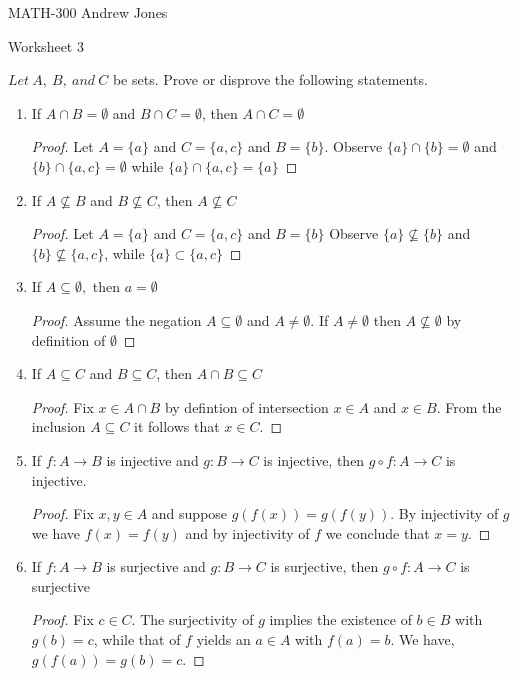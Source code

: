 \documentclass{article}
\begin{document}
  MATH-300 \hfill Andrew Jones
  \begin{center}
  {\huge Worksheet 3}
  \end{center}
  $Let\ A,\ B,\ and\ C$ be sets. Prove or disprove the following statements. \\
  \begin{enumerate}
  \item If $A\cap B = \emptyset$ and $B\cap C = \emptyset$, then $A\cap C = \emptyset$
    \begin{proof}
      Let $A = \{a\}$ and $C = \{a, c\}$ and $B = \{b\}$.
      Observe $\{a\}\cap \{b\} = \emptyset$ and $\{b\}\cap \{a, c\} = \emptyset$ while $\{a\}\cap \{a,c\} = \{a\}$
    \end{proof}
  \item If $A\not\subseteq B$ and $B\not\subseteq C$, then $A\not\subseteq C$ 
    \begin{proof}
      Let $A = \{a\}$ and $C = \{a, c\}$ and $B = \{b\}$ 
      Observe $\{a\}\not\subseteq \{b\}$ and $\{b\}\not\subseteq \{a, c\}$, while $\{a\}\subset \{a, c\}$
    \end{proof}
  \item If $A\subseteq \emptyset,$ then $a= \emptyset$ 
    \begin{proof}
      Assume the negation $A\subseteq \emptyset$ and $A \neq \emptyset$.
      If $A \neq \emptyset$ then $A\not\subseteq \emptyset$ by definition of $\emptyset$ 
    \end{proof}
  \item If $A\subseteq C$ and $B\subseteq C$, then $A\cap B\subseteq C$
    \begin{proof}
     Fix  $x \in A\cap B$ by defintion of intersection $x\in A$ and $x\in B$. From the inclusion $A\subseteq C$ it follows that $x\in C$.
   \end{proof}
  \item If $f : A\to B$ is injective and $g : B\to C$ is injective, then $g \circ f : A\to C$ is injective. 
    \begin{proof}
      Fix $x,y\in A$ and suppose $g(f(x)) = g(f(y))$. By injectivity of $g$ we have $f(x) = f(y)$ and by injectivity of $f$ we conclude that $x = y$.
    \end{proof}
  \item If $f : A\to B$ is surjective and $g : B\to C$ is surjective, then $g \circ f : A\to C$ is surjective 
    \begin{proof}
      Fix $c\in C$. The surjectivity of $g$ implies the existence of $b\in B$ with $g(b) =c$, while that of $f$ yields an $a\in A$ with $f(a) = b$. We have, $g(f(a)) = g(b) = c$. 

\end{proof}
\end{enumerate}
\end{document}
